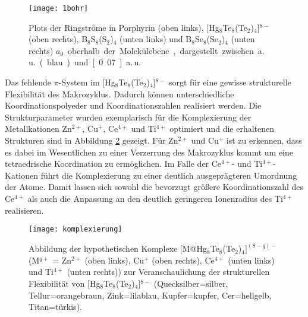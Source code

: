  

\begin{figure}[ht!]
	\centering
	\texttt{[image: 1bohr]}
	\captionsetup{figurewithin = chapter}
	\captionsetup{font=small, labelfont=bf}\caption[{Porphyrin, $[$Hg$_8$Te$_8$(Te$_2$)$_4$]$^{8-}$, B$_8$S$_8$(S$_2$)$_4$ und B$_8$Se$_8$(Se$_2$)$_4$: Plots der Ringströme}]{Plots der Ringströme in Porphyrin (oben links), $[$Hg$_8$Te$_8$(Te$_2$)$_4$]$^{8-}$ (oben rechts), B$_8$S$_8$(S$_2$)$_4$ (unten links) und B$_8$Se$_8$(Se$_2$)$_4$ (unten rechts) \unit[1]{$a_0$} oberhalb der Molekülebene, dargestellt zwischen \unit[0]{a.\,u.} (blau) und \unit[0.07]{a.\,u.}}
\label{abb:lic}
\end{figure}

\FloatBarrier
Das fehlende $\pi$-System im $[$Hg$_8$Te$_8$(Te$_2$)$_4$]$^{8-}$ sorgt für eine gewisse strukturelle Flexibilität des Makrozyklus. Dadurch können unterschiedliche Koordinationspolyeder und Koordinationszahlen realisiert werden. Die Strukturparameter wurden exemplarisch für die Komplexierung der Metallkationen Zn$^{2+}$, Cu$^+$, Ce$^{4+}$ und Ti$^{4+}$ optimiert und die erhaltenen Strukturen sind in Abbildung \ref{abb:komplexierung} gezeigt. Für Zn$^{2+}$ und Cu$^+$ ist zu erkennen, dass es dabei im Wesentlichen zu einer Verzerrung des Makrozyklus kommt um eine tetraedrische Koordination zu ermöglichen. Im Falle der Ce$^{4+}$- und Ti$^{4+}$-Kationen führt die Komplexierung zu einer deutlich ausgeprägteren Umordnung der Atome. Damit lassen sich sowohl die bevorzugt größere Koordinationszahl des Ce$^{4+}$ als auch die Anpassung an den deutlich geringeren Ionenradius des Ti$^{4+}$ realisieren.

\begin{figure}[ht!]
	\centering
	\texttt{[image: komplexierung]}
	\captionsetup{figurewithin = chapter}
	\captionsetup{font=small, labelfont=bf}\caption[{Abbildungen der hypothetischen Komplexe [M@Hg$_8$Te$_8$(Te$_2$)$_4]^{(8-q)-}$ (M$^{q+}$ = Zn$^{2+}$, Cu$^+$ , Ce$^{4+}$ und Ti$^{4+}$)}]{{Abbildung der hypothetischen Komplexe [M@Hg$_8$Te$_8$(Te$_2$)$_4]^{(8-q)-}$ (M$^{q+}$ = Zn$^{2+}$ (oben links), Cu$^+$ (oben rechts), Ce$^{4+}$ (unten links) und Ti$^{4+}$ (unten rechts))} zur Veranschaulichung der strukturellen Flexibilität von $[$Hg$_8$Te$_8$(Te$_2$)$_4$]$^{8-}$ (Quecksilber=silber, Tellur=orangebraun, Zink=lilablau, Kupfer=kupfer, Cer=hellgelb, Titan=türkis). }
\label{abb:komplexierung}
\end{figure}

